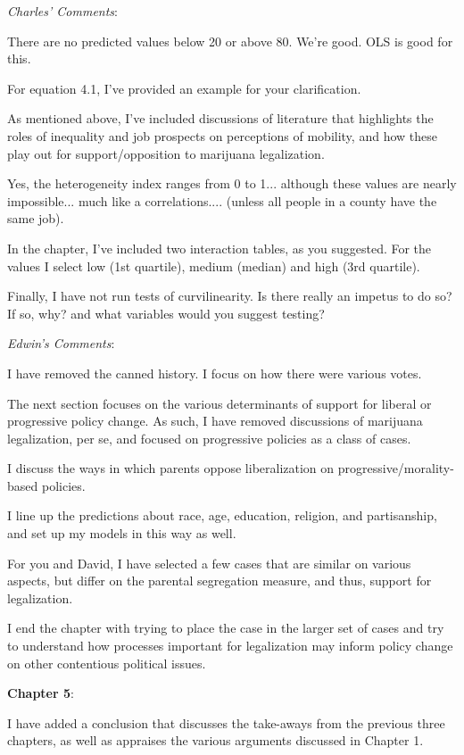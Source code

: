 \documentclass[12pt,stdletter,dateno,sigleft]{newlfm} %
\begin{document}
\begin{newlfm}
\textit{Charles' Comments}:

There are no predicted values below 20 or above 80. We're good. OLS is good for this. 

For equation 4.1, I've provided an example for your clarification. 

As mentioned above, I've included discussions of literature that highlights the roles of inequality and job prospects on perceptions of mobility, and how these play out for support/opposition to marijuana legalization. 

Yes, the heterogeneity index ranges from 0 to 1...  although these values are nearly impossible... much like a correlations.... (unless all people in a county have the same job). 


In the chapter, I've included two interaction tables, as you suggested. For the values I select low (1st quartile), medium (median) and high (3rd quartile). 

Finally, I have not run tests of curvilinearity. Is there really an impetus to do so? If so, why? and what variables would you suggest testing? \newline


\textit{Edwin's Comments}:

I have removed the canned history. I focus on how there were various votes. 

The next section focuses on the various determinants of support for liberal or progressive policy change. As such, I have removed discussions of marijuana legalization, per se, and focused on progressive policies as a class of cases. 

I discuss the ways in which parents oppose liberalization on progressive/morality-based policies. 

I line up the predictions about race, age, education, religion, and partisanship, and set up my models in this way as well. 

For you and David, I have selected a few cases that are similar on various aspects, but differ on the parental segregation measure, and thus, support for legalization. 


I end the chapter with trying to place the case in the larger set of cases and try to understand how processes important for legalization may inform policy change on other contentious political issues. \newline



\textbf{Chapter 5}: 

I have added a conclusion that discusses the take-aways from the previous three chapters, as well as appraises the various arguments discussed in Chapter 1.


\end{newlfm}
\end{document}
